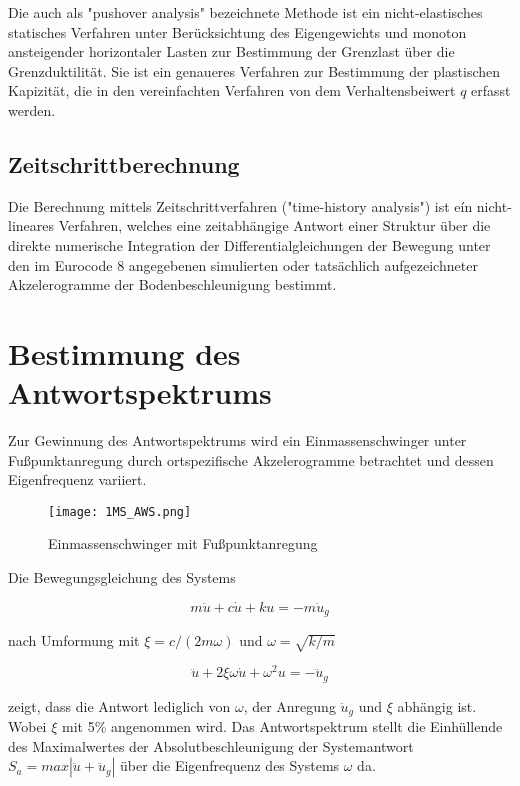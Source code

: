 Die auch als "pushover analysis" bezeichnete Methode ist ein nicht-elastisches statisches Verfahren unter Berücksichtung des Eigengewichts und monoton ansteigender horizontaler Lasten zur Bestimmung der Grenzlast über die Grenzduktilität.
Sie ist ein genaueres Verfahren zur Bestimmung der plastischen Kapizität, die in den vereinfachten Verfahren von dem Verhaltensbeiwert $q$ erfasst werden.

\subsection{Zeitschrittberechnung}
\label{sec:Zeitschrittberechnung}

Die Berechnung mittels Zeitschrittverfahren ("time-history analysis") ist eín nicht-lineares Verfahren, welches eine zeitabhängige Antwort einer Struktur über die direkte numerische Integration der Differentialgleichungen der Bewegung unter den im Eurocode 8 angegebenen simulierten oder tatsächlich aufgezeichneter Akzelerogramme der Bodenbeschleunigung bestimmt. 

\pagebreak

\section{Bestimmung des Antwortspektrums}
\label{sec:Antwortspektren}

Zur Gewinnung des Antwortspektrums wird ein Einmassenschwinger unter Fußpunktanregung durch ortspezifische Akzelerogramme betrachtet und dessen Eigenfrequenz variiert.

\begin{figure}[H]
    \centering
    \texttt{[image: 1MS\_AWS.png]}
    \caption{Einmassenschwinger mit Fußpunktanregung}
\end{figure}

Die Bewegungsgleichung des Systems

\begin{equation} \label{ems_aws}
m \ddot u + c \dot u + k u = -m \ddot u_g
\end{equation}

nach Umformung mit $\xi = c/(2m\omega)$ und $\omega = \sqrt{k/m}$

\begin{equation} \label{ems_aws_umf}
\ddot u + 2\xi\omega \dot u + \omega^2 u = - \ddot u_g
\end{equation}

zeigt, dass die Antwort lediglich von $\omega$, der Anregung $\ddot u_g$ und $\xi$ abhängig ist. Wobei $\xi$ mit 5\% angenommen wird.
Das Antwortspektrum stellt die Einhüllende des Maximalwertes der Absolutbeschleunigung der Systemantwort $S_a=max|\ddot u + \ddot u_g|$ über die Eigenfrequenz des Systems $\omega$ da. \cite{Bachmann}

